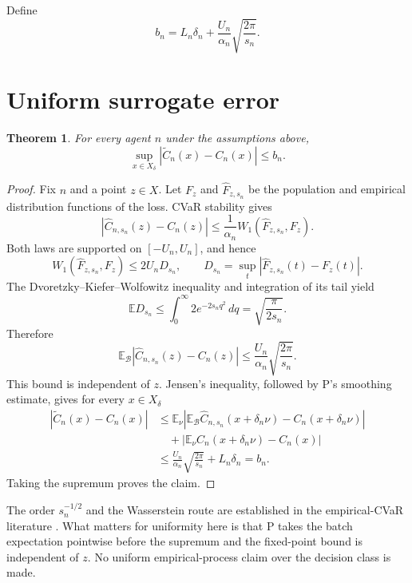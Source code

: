 \documentclass{article}
\newtheorem{theorem}{Theorem}
\begin{document}
Define
\[
 b_n=L_n\delta_n+\frac{U_n}{\alpha_n}
       \sqrt{\frac{2\pi}{s_n}}.
\]

\section{Uniform surrogate error}

\begin{theorem}\label{thm:uniform}
For every agent $n$ under the assumptions above,
\[
 \sup_{x\in X_\delta}
 |\widetilde C_n(x)-C_n(x)|\leq b_n.
\]
\end{theorem}

\begin{proof}
Fix $n$ and a point $z\in X$.  Let $F_z$ and $\widehat F_{z,s_n}$ be the population and empirical distribution functions of the loss.  CVaR stability gives
\[
 |\widehat C_{n,s_n}(z)-C_n(z)|
 \leq \frac{1}{\alpha_n}
 W_1(\widehat F_{z,s_n},F_z).
\]
Both laws are supported on $[-U_n,U_n]$, and hence
\[
 W_1(\widehat F_{z,s_n},F_z)
 \leq 2U_n D_{s_n},
 \qquad
 D_{s_n}=\sup_t|\widehat F_{z,s_n}(t)-F_z(t)|.
\]
The Dvoretzky--Kiefer--Wolfowitz inequality and integration of its tail yield
\[
 \mathbb E D_{s_n}
 \leq \int_0^\infty 2e^{-2s_nq^2}\,dq
 =\sqrt{\frac{\pi}{2s_n}}.
\]
Therefore
\[
 \mathbb E_{\mathcal B}
 |\widehat C_{n,s_n}(z)-C_n(z)|
 \leq \frac{U_n}{\alpha_n}\sqrt{\frac{2\pi}{s_n}}.
\]
This bound is independent of $z$.  Jensen's inequality, followed by P's smoothing estimate, gives for every $x\in X_\delta$
\begin{align*}
 |\widetilde C_n(x)-C_n(x)|
 &\leq \mathbb E_\nu
 \left|\mathbb E_{\mathcal B}\widehat C_{n,s_n}(x+\delta_n\nu)
       -C_n(x+\delta_n\nu)\right| \\
 &\quad+
 \left|\mathbb E_\nu C_n(x+\delta_n\nu)-C_n(x)\right| \\
 &\leq \frac{U_n}{\alpha_n}\sqrt{\frac{2\pi}{s_n}}
       +L_n\delta_n=b_n.
\end{align*}
Taking the supremum proves the claim.
\end{proof}

The order $s_n^{-1/2}$ and the Wasserstein route are established in the empirical-CVaR literature \cite{prashanth2019}.  What matters for uniformity here is that P takes the batch expectation pointwise before the supremum and the fixed-point bound is independent of $z$.  No uniform empirical-process claim over the decision class is made.  %
\end{document}
